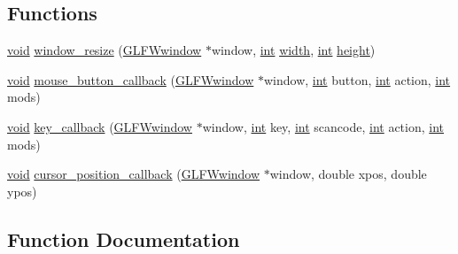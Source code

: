 \subsection*{Functions}
\begin{DoxyCompactItemize}
\item 
\hyperlink{wglew_8h_aeea6e3dfae3acf232096f57d2d57f084}{void} \hyperlink{namespaceu__engine_1_1graphics_ae4afea9df23f60dfcd44f6a587ecdf95}{window\+\_\+resize} (\hyperlink{group__window_ga3c96d80d363e67d13a41b5d1821f3242}{G\+L\+F\+Wwindow} $\ast$window, \hyperlink{wglew_8h_a500a82aecba06f4550f6849b8099ca21}{int} \hyperlink{glew_8h_aa105b18f96e6bc2485cb7f576a7fb9ba}{width}, \hyperlink{wglew_8h_a500a82aecba06f4550f6849b8099ca21}{int} \hyperlink{glew_8h_aa214bd63e12f7ddf524c83894fcc69a7}{height})
\item 
\hyperlink{wglew_8h_aeea6e3dfae3acf232096f57d2d57f084}{void} \hyperlink{namespaceu__engine_1_1graphics_ac31e754896e2a053b38cf3cc842ef3ec}{mouse\+\_\+button\+\_\+callback} (\hyperlink{group__window_ga3c96d80d363e67d13a41b5d1821f3242}{G\+L\+F\+Wwindow} $\ast$window, \hyperlink{wglew_8h_a500a82aecba06f4550f6849b8099ca21}{int} button, \hyperlink{wglew_8h_a500a82aecba06f4550f6849b8099ca21}{int} action, \hyperlink{wglew_8h_a500a82aecba06f4550f6849b8099ca21}{int} mods)
\item 
\hyperlink{wglew_8h_aeea6e3dfae3acf232096f57d2d57f084}{void} \hyperlink{namespaceu__engine_1_1graphics_ac676971bc941d55fd95cc6da0041a878}{key\+\_\+callback} (\hyperlink{group__window_ga3c96d80d363e67d13a41b5d1821f3242}{G\+L\+F\+Wwindow} $\ast$window, \hyperlink{wglew_8h_a500a82aecba06f4550f6849b8099ca21}{int} key, \hyperlink{wglew_8h_a500a82aecba06f4550f6849b8099ca21}{int} scancode, \hyperlink{wglew_8h_a500a82aecba06f4550f6849b8099ca21}{int} action, \hyperlink{wglew_8h_a500a82aecba06f4550f6849b8099ca21}{int} mods)
\item 
\hyperlink{wglew_8h_aeea6e3dfae3acf232096f57d2d57f084}{void} \hyperlink{namespaceu__engine_1_1graphics_adee435291af6de6077aaffaf9b07f57c}{cursor\+\_\+position\+\_\+callback} (\hyperlink{group__window_ga3c96d80d363e67d13a41b5d1821f3242}{G\+L\+F\+Wwindow} $\ast$window, double xpos, double ypos)
\end{DoxyCompactItemize}


\subsection{Function Documentation}
\hypertarget{namespaceu__engine_1_1graphics_adee435291af6de6077aaffaf9b07f57c}{}

